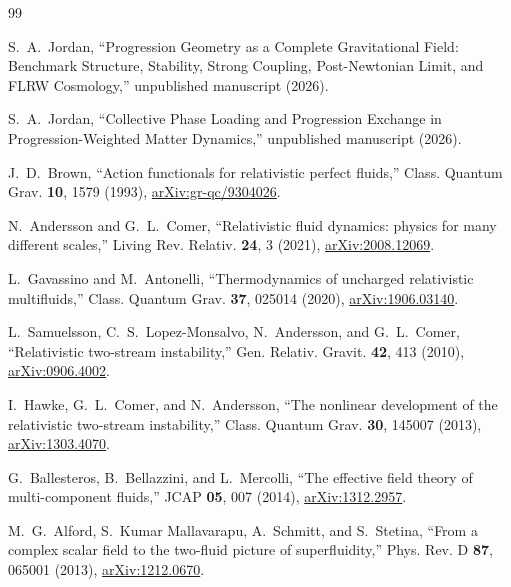 \documentclass[11pt]{article}
\begin{document}
\begin{thebibliography}{99}

S.~A.~Jordan,
``Progression Geometry as a Complete Gravitational Field: Benchmark Structure, Stability, Strong Coupling, Post-Newtonian Limit, and FLRW Cosmology,''
unpublished manuscript (2026).

S.~A.~Jordan,
``Collective Phase Loading and Progression Exchange in Progression-Weighted Matter Dynamics,''
unpublished manuscript (2026).

J.~D.~Brown,
``Action functionals for relativistic perfect fluids,''
Class. Quantum Grav. \textbf{10}, 1579 (1993),
\href{https://arxiv.org/abs/gr-qc/9304026}{arXiv:gr-qc/9304026}.

N.~Andersson and G.~L.~Comer,
``Relativistic fluid dynamics: physics for many different scales,''
Living Rev. Relativ. \textbf{24}, 3 (2021),
\href{https://arxiv.org/abs/2008.12069}{arXiv:2008.12069}.

L.~Gavassino and M.~Antonelli,
``Thermodynamics of uncharged relativistic multifluids,''
Class. Quantum Grav. \textbf{37}, 025014 (2020),
\href{https://arxiv.org/abs/1906.03140}{arXiv:1906.03140}.

L.~Samuelsson, C.~S.~Lopez-Monsalvo, N.~Andersson, and G.~L.~Comer,
``Relativistic two-stream instability,''
Gen. Relativ. Gravit. \textbf{42}, 413 (2010),
\href{https://arxiv.org/abs/0906.4002}{arXiv:0906.4002}.

I.~Hawke, G.~L.~Comer, and N.~Andersson,
``The nonlinear development of the relativistic two-stream instability,''
Class. Quantum Grav. \textbf{30}, 145007 (2013),
\href{https://arxiv.org/abs/1303.4070}{arXiv:1303.4070}.

G.~Ballesteros, B.~Bellazzini, and L.~Mercolli,
``The effective field theory of multi-component fluids,''
JCAP \textbf{05}, 007 (2014),
\href{https://arxiv.org/abs/1312.2957}{arXiv:1312.2957}.

M.~G.~Alford, S.~Kumar Mallavarapu, A.~Schmitt, and S.~Stetina,
``From a complex scalar field to the two-fluid picture of superfluidity,''
Phys. Rev. D \textbf{87}, 065001 (2013),
\href{https://arxiv.org/abs/1212.0670}{arXiv:1212.0670}.

\end{thebibliography}
\end{document}
